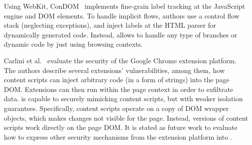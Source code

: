 Using WebKit, ConDOM~\cite{ConDOM} implements fine-grain label tracking at the
JavaScript engine and DOM elements. To handle implicit flows, authors use a
control flow stack (neglecting exceptions), and inject labels at the HTML parser
for dynamically generated code. Instead, \sys{} allows to handle any type of
branches or dynamic code by just using browsing contexts.

Carlini et al.~\cite{Carlini:2012} evaluate the security of the Google Chrome
extension platform. The authors describe several extensions' vulnerabilities, among them,
how content scripts can inject arbitrary code (in a form of strings) into the
page DOM. Extensions can then run within the page context in order
to exfiltrate data. \sys{} is capable to securely mimicking content scripts, but
with weaker isolation guarantees.  Specifically, content scripts operate on a
copy of DOM wrapper objects, which makes changes not visible for the
page. Instead, \sys{} versions of content scripts work directly on the page DOM.
It is stated as future work to evaluate how to express other 
security mechanisms from the extension platform into \sys{}. 

 

